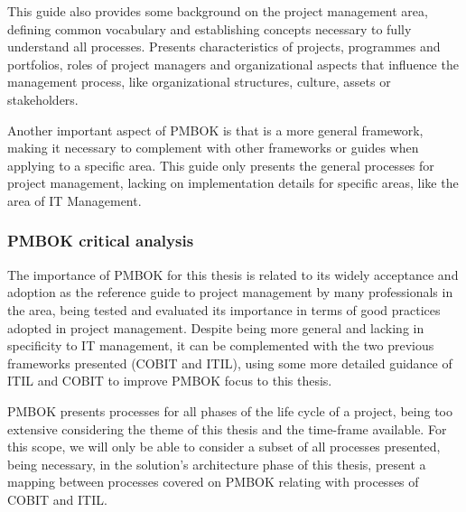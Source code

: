 This guide also provides some background on the project management area, defining common vocabulary and establishing concepts necessary to fully understand all processes. Presents characteristics of projects, programmes and portfolios, roles of project managers and organizational aspects that influence the management process, like organizational structures, culture, assets or stakeholders.\par 
Another important aspect of PMBOK is that is a more general framework, making it necessary to complement with other frameworks or guides when applying to a specific area. This guide only presents the general processes for project management, lacking on implementation details for specific areas, like the area of IT Management.\par 

\subsubsection{PMBOK critical analysis}

The importance of PMBOK for this thesis is related to its widely acceptance and adoption as the reference guide to project management by many professionals in the area, being tested and evaluated its importance in terms of good practices adopted in project management. Despite being more general and lacking in specificity to IT management, it can be complemented with the two previous frameworks presented (COBIT and ITIL), using some more detailed guidance of ITIL and COBIT to improve PMBOK focus to this thesis.\par
PMBOK presents processes for all phases of the life cycle of a project, being too extensive considering the theme of this thesis and the time-frame available. For this scope, we will only be able to consider a subset of all processes presented, being necessary, in the solution's architecture phase of this thesis, present a mapping between processes covered on PMBOK relating with processes of COBIT and ITIL.











